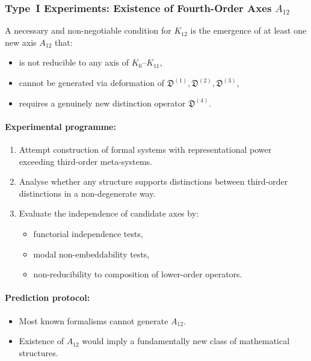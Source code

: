\subsubsection{Type~I Experiments: Existence of Fourth-Order Axes $A_{12}$}

A necessary and non-negotiable condition for $K_{12}$ is the emergence
of at least one new axis $A_{12}$ that:

\begin{itemize}
    \item is not reducible to any axis of $K_{0}$–$K_{11}$,
    \item cannot be generated via deformation of
          $\mathfrak{D}^{(1)}, \mathfrak{D}^{(2)}, \mathfrak{D}^{(3)}$,
    \item requires a genuinely new distinction operator
          $\mathfrak{D}^{(4)}$.
\end{itemize}

\paragraph{Experimental programme:}

\begin{enumerate}
    \item Attempt construction of formal systems with representational
          power exceeding third-order meta-systems.
    \item Analyse whether any structure supports distinctions
          between third-order distinctions in a non-degenerate way.
    \item Evaluate the independence of candidate axes by:
          \begin{itemize}
              \item functorial independence tests,
              \item modal non-embeddability tests,
              \item non-reducibility to composition of lower-order operators.
          \end{itemize}
\end{enumerate}

\paragraph{Prediction protocol:}

\begin{itemize}
    \item Most known formalisms cannot generate $A_{12}$.
    \item Existence of $A_{12}$ would imply a fundamentally new class
          of mathematical structures.
\end{itemize}



